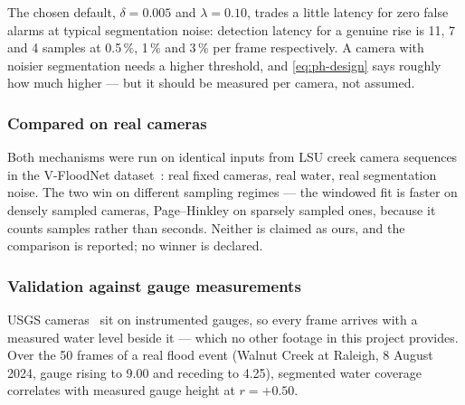 \begin{table}[htbp]
\centering\small
\caption{Page--Hinkley false-alarm rate on stable water, measured over 200
trials of 40 samples, against the drawdown model of \cref{eq:ph-far}. All
values are percentages. The model consistently \emph{under}-predicts — by
roughly a factor of two in the interesting region — because it assumes the
infinite-time limit and treats the running-mean subtraction as exact. It
nevertheless reproduces the ordering across every row and column and locates
the usable/unusable boundary correctly, so \cref{eq:ph-design} is a sound
floor for a new camera and not a substitute for measuring it. Computed from
\texttt{eval/results/page\_hinkley\_calibration.json}.}
\label{tab:ph}

\end{table}

The chosen default, $\delta = 0.005$ and $\lambda = 0.10$, trades a little
latency for zero false alarms at typical segmentation noise: detection latency
for a genuine rise is 11, 7 and 4 samples at 0.5\,\%, 1\,\% and 3\,\% per
frame respectively. A camera with noisier segmentation needs a higher
threshold, and \cref{eq:ph-design} says roughly how much higher — but it
should be measured per camera, not assumed.

\subsubsection{Compared on real cameras}

Both mechanisms were run on identical inputs from LSU creek camera sequences
in the V-FloodNet dataset~\citep{liang2022vfloodnet}: real fixed cameras, real
water, real segmentation noise. The two win on different sampling regimes —
the windowed fit is faster on densely sampled cameras, Page--Hinkley on
sparsely sampled ones, because it counts samples rather than seconds. Neither
is claimed as ours, and the comparison is reported; no winner is
declared.

\subsubsection{Validation against gauge measurements}
\label{sec:gage}

USGS cameras~\citep{usgshivis} sit on instrumented gauges, so every frame
arrives with a measured water level beside it — which no other footage in this
project provides. Over the 50 frames of a real flood event (Walnut Creek at
Raleigh, 8 August 2024, gauge rising to \SI{9.00}{\foot} and receding to
\SI{4.25}{\foot}), segmented water coverage correlates with measured gauge
height at $r = +0.50$.

